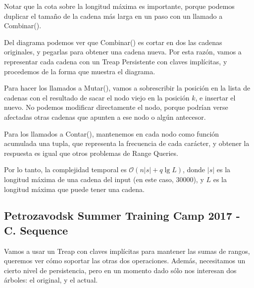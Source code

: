 Notar que la cota sobre la longitud máxima es importante, porque podemos duplicar el tamaño de la cadena más larga en un paso con un llamado a Combinar().



Del diagrama podemos ver que Combinar() es cortar en dos las cadenas originales, y pegarlas para obtener una cadena nueva.
Por esta razón, vamos a representar cada cadena con un Treap Persistente con claves implícitas, y procedemos de la forma que muestra el diagrama.

Para hacer los llamados a Mutar(), vamos a sobrescribir la posición en la lista de cadenas
con el resultado de sacar el nodo viejo en la posición \(k\), e insertar el nuevo.
No podemos modificar directamente el nodo, porque podrían verse afectadas otras cadenas que apunten a ese nodo o algún antecesor.

Para los llamados a Contar(), mantenemos en cada nodo como función acumulada una tupla, que representa la frecuencia de cada carácter, 
y obtener la respuesta es igual que otros problemas de Range Queries.

Por lo tanto, la complejidad temporal es \(\mathcal{O}(n |s| + q \lg L)\), donde \(|s|\) es la longitud máxima de una cadena del input (en este caso, 30000), 
y \(L\) es la longitud máxima que puede tener una cadena.

\subsection{Petrozavodsk Summer Training Camp 2017 - C. Sequence}


Vamos a usar un Treap con claves implícitas para mantener las sumas de rangos, queremos ver cómo soportar las otras dos operaciones.
Además, necesitamos un cierto nivel de persistencia, pero en un momento dado sólo nos interesan dos árboles: el original, y el actual.

